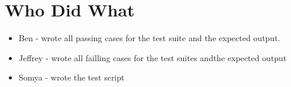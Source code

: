 \documentclass[./Report_main.tex]{subfiles}
\begin{document}
\section{Who Did What}
\begin{itemize}
    \item Ben - wrote all passing cases for the test suite and the expected output. 
    \item Jeffrey - wrote all failling cases for the test suites andthe expected output
    \item Somya - wrote the test script
\end{itemize}
\end{document}
